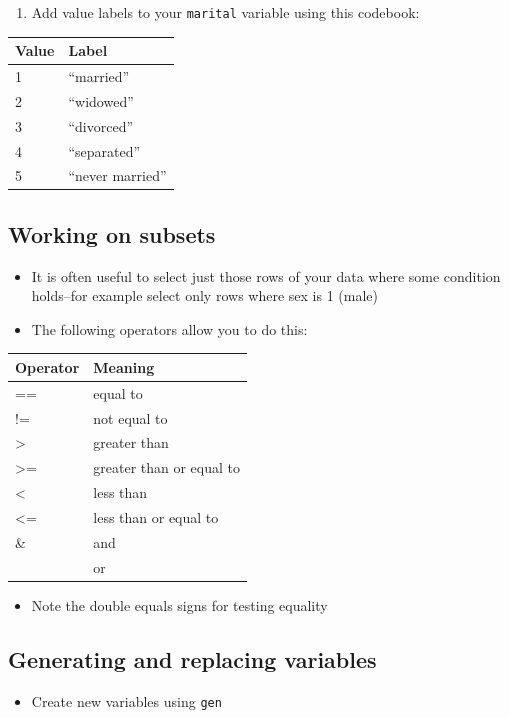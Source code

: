 \documentclass[]{book}
\providecommand{\tightlist}{%
  \setlength{\itemsep}{0pt}\setlength{\parskip}{0pt}}
\begin{document}
\begin{enumerate}
\def\labelenumi{\arabic{enumi}.}
\tightlist
\item
  Add value labels to your \texttt{marital} variable using this
  codebook:
\end{enumerate}

\begin{longtable}[]{@{}ll@{}}
\toprule
Value & Label\tabularnewline
\midrule
\endhead
1 & ``married''\tabularnewline
2 & ``widowed''\tabularnewline
3 & ``divorced''\tabularnewline
4 & ``separated''\tabularnewline
5 & ``never married''\tabularnewline
\bottomrule
\end{longtable}

\subsection{Working on subsets}\label{working-on-subsets}

\begin{itemize}
\tightlist
\item
  It is often useful to select just those rows of your data where some
  condition holds--for example select only rows where sex is 1 (male)
\item
  The following operators allow you to do this:
\end{itemize}

\begin{longtable}[]{@{}ll@{}}
\toprule
Operator & Meaning\tabularnewline
\midrule
\endhead
== & equal to\tabularnewline
!= & not equal to\tabularnewline
\textgreater{} & greater than\tabularnewline
\textgreater{}= & greater than or equal to\tabularnewline
\textless{} & less than\tabularnewline
\textless{}= & less than or equal to\tabularnewline
\& & and\tabularnewline
\textbar{} & or\tabularnewline
\bottomrule
\end{longtable}

\begin{itemize}
\tightlist
\item
  Note the double equals signs for testing equality
\end{itemize}

\subsection{Generating and replacing
variables}\label{generating-and-replacing-variables}

\begin{itemize}
\tightlist
\item
  Create new variables using \texttt{gen}
\end{itemize}
\end{document}
